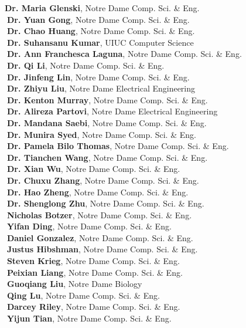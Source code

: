 \documentclass[10pt]{article}
\newenvironment{myindentpar}[1]%
{\begin{list}{}%
         {\setlength{\leftmargin}{#1}}%
         \item[]%
}
{\end{list}}
\newcounter{list}
\begin{document}
\begin{myindentpar}{0.75cm}
{\textcolor{white}{} {\bf Dr. Maria Glenski}, Notre Dame Comp. Sci. \& Eng. \\
\textcolor{white}{.}{\bf Dr. Yuan Gong}, Notre Dame Comp. Sci. \& Eng. \\
\textcolor{white}{.}{\bf Dr. Chao Huang}, Notre Dame Comp. Sci. \& Eng. \\
\textcolor{white}{.}{\bf Dr. Suhansanu Kumar}, UIUC Computer Science \\
\textcolor{white}{.}{\bf Dr. Ann Franchesca Laguna}, Notre Dame Comp. Sci. \& Eng. \\
\textcolor{white}{.}{\bf Dr. Qi Li}, Notre Dame Comp. Sci. \& Eng. \\
\textcolor{white}{.}{\bf Dr. Jinfeng Lin}, Notre Dame Comp. Sci. \& Eng. \\
\textcolor{white}{.}{\bf Dr. Zhiyu Liu}, Notre Dame Electrical Engineering \\
\textcolor{white}{.}{\bf Dr. Kenton Murray}, Notre Dame Comp. Sci. \& Eng. \\
\textcolor{white}{.}{\bf Dr. Alireza Partovi}, Notre Dame Electrical Engineering \\
\textcolor{white}{.}{\bf Dr. Mandana Saebi}, Notre Dame Comp. Sci. \& Eng. \\
\textcolor{white}{.}{\bf Dr. Munira Syed}, Notre Dame Comp. Sci. \& Eng. \\
\textcolor{white}{.}{\bf Dr. Pamela Bilo Thomas}, Notre Dame Comp. Sci. \& Eng. \\
\textcolor{white}{.}{\bf Dr. Tianchen Wang}, Notre Dame Comp. Sci. \& Eng. \\
\textcolor{white}{.}{\bf Dr. Xian Wu}, Notre Dame Comp. Sci. \& Eng. \\
\textcolor{white}{.}{\bf Dr. Chuxu Zhang}, Notre Dame Comp. Sci. \& Eng. \\
\textcolor{white}{.}{\bf Dr. Hao Zheng}, Notre Dame Comp. Sci. \& Eng. \\
\textcolor{white}{.}{\bf Dr. Shenglong Zhu}, Notre Dame Comp. Sci. \& Eng. \\
\textcolor{white}{.}{\bf Nicholas Botzer}, Notre Dame Comp. Sci. \& Eng. \\
\textcolor{white}{.}{\bf Yifan Ding}, Notre Dame Comp. Sci. \& Eng. \\
\textcolor{white}{.}{\bf Daniel Gonzalez}, Notre Dame Comp. Sci. \& Eng. \\
\textcolor{white}{.}{\bf Justus Hibshman}, Notre Dame Comp. Sci. \& Eng. \\
\textcolor{white}{.}{\bf Steven Krieg}, Notre Dame Comp. Sci. \& Eng. \\
\textcolor{white}{.}{\bf Peixian Liang}, Notre Dame Comp. Sci. \& Eng. \\
\textcolor{white}{.}{\bf Guoqiang Liu}, Notre Dame Biology \\
\textcolor{white}{.}{\bf Qing Lu}, Notre Dame Comp. Sci. \& Eng. \\
\textcolor{white}{.}{\bf Darcey Riley}, Notre Dame Comp. Sci. \& Eng. \\
\textcolor{white}{.}{\bf Yijun Tian}, Notre Dame Comp. Sci. \& Eng.
}


\end{myindentpar}
\end{document}

